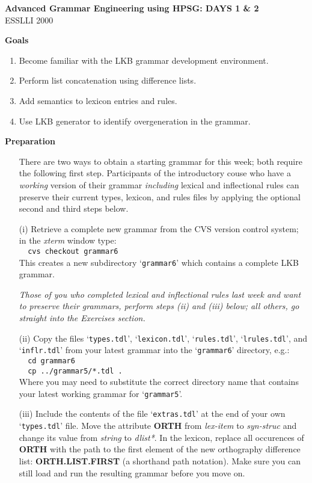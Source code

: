 \documentclass[10pt]{article}
\newcommand{\att}[1]{{\mbox{\scriptsize {\bf #1}}}}
\begin{document}
\begin{center}
\textbf{Advanced Grammar Engineering using HPSG: DAYS 1 \& 2}\\
ESSLLI 2000
\end{center}

\medskip
\textbf{Goals}
\begin{enumerate}
  \item Become familiar with the LKB grammar development environment.
  \item Perform list concatenation using difference lists.
  \item Add semantics to lexicon entries and rules.
  \item Use LKB generator to identify overgeneration in the grammar.
\end{enumerate}

\smallskip
\textbf{Preparation}
\begin{itemize}
  \item []
        There are two ways to obtain a starting grammar for this week;
        both require the following first step.  Participants of the
        introductory couse who have a {\em working\/} version of their
        grammar {\em including\/} lexical and inflectional rules can
        preserve their current types, lexicon, and rules files by
        applying the optional second and third steps below.
  \item [(i)]
        Retrieve a complete new grammar from the CVS version control
        system; in the {\em xterm\/} window type:\\
        \verb|  cvs checkout grammar6|\\
        This creates a new subdirectory `{\tt grammar6}' which contains
        a complete LKB grammar.
  \item []
        {\em Those of you who completed lexical and inflectional rules
        last week and want to preserve their grammars, perform steps
        (ii) and (iii) below; all others, go straight into the
        Exercises section.}
  \item [(ii)]
        Copy the files `{\tt types.tdl}', `{\tt lexicon.tdl}', 
        `{\tt rules.tdl}', `{\tt lrules.tdl}', and `{\tt inflr.tdl}'
        from your latest grammar into the `{\tt grammar6}' directory,
        e.g.:\\
        \verb|  cd grammar6|\\
        \verb|  cp ../grammar5/*.tdl .|\\
        Where you may need to substitute the correct directory name that
        contains your latest working grammar for `{\tt grammar5}'.
  \item [(iii)]
        Include the contents of the file `{\tt extras.tdl}' at the end
        of your own `{\tt types.tdl}' file.
        Move the attribute \att{ORTH} from {\it lex-item} to
        {\it syn-struc} and change its value from {\it string} to
        {\it *dlist*}.
        In the lexicon, replace all occurences of \att{ORTH} with the
        path to the first element of the new orthography difference
        list: \att{ORTH.LIST.FIRST} (a shorthand path notation).
        Make sure you can still load and run the resulting grammar
        before you move on.
\end{itemize}
\end{document}
